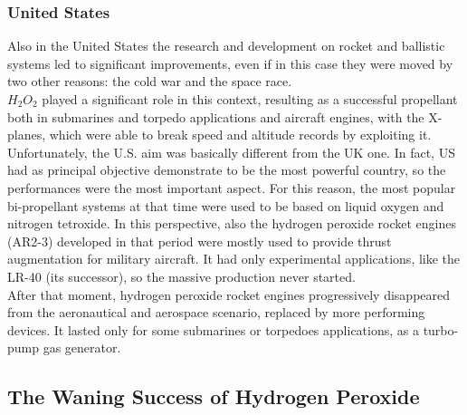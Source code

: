 \documentclass[a4paper]{report}
\begin{document}
\subsubsection{United States}

Also in the United States the research and development on rocket and ballistic systems led to significant improvements, even if in this case they were moved by two other reasons: the cold war and the space race. \\
$H_2O_2$ played a significant role in this context, resulting as a successful propellant both in submarines and torpedo applications and aircraft engines, with the X-planes, which were able to break speed and altitude records by exploiting it. Unfortunately, the U.S. aim was basically different from the UK one. In fact, US had as principal objective demonstrate to be the most powerful country, so the performances were the most important aspect. For this reason, the most popular bi-propellant systems at that time were used to be based on liquid oxygen and nitrogen tetroxide. In this perspective, also the hydrogen peroxide rocket engines (AR2-3) developed in that period were mostly used to provide thrust augmentation for military aircraft. It had only experimental applications, like the LR-40 (its successor), so the massive production never started. \\
After that moment, hydrogen peroxide rocket engines progressively disappeared from the aeronautical and aerospace scenario, replaced by more performing devices. It lasted only for some submarines or torpedoes applications, as a turbo-pump gas generator. \\

\subsection{The Waning Success of Hydrogen Peroxide}
\end{document}
